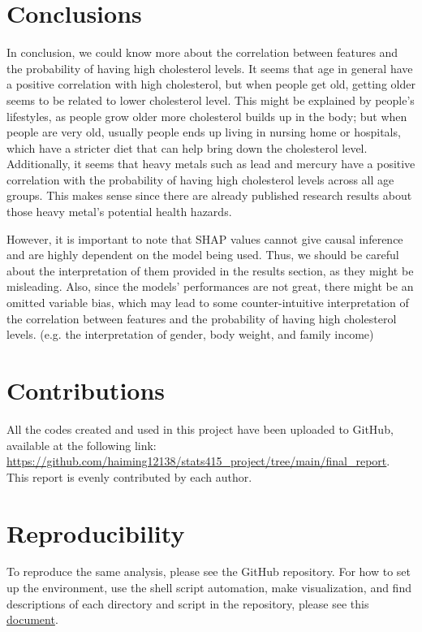 \documentclass{article}
\begin{document}
\section{Conclusions}
In conclusion, we could know more about the correlation between features and the probability of having high cholesterol levels. It seems that age in general have a positive correlation with high cholesterol, but when people get old, getting older seems to be related to lower cholesterol level. This might be explained by people's lifestyles, as people grow older more cholesterol builds up in the body; but when people are very old, usually people ends up living in nursing home or hospitals, which have a stricter diet that can help bring down the cholesterol level. Additionally, it seems that heavy metals such as lead and mercury have a positive correlation with the probability of having high cholesterol levels across all age groups. This makes sense since there are already published research results about those heavy metal's potential health hazards.

However, it is important to note that SHAP values cannot give causal inference and are highly dependent on the model being used. Thus, we should be careful about the interpretation of them provided in the results section, as they might be misleading. Also, since the models' performances are not great, there might be an omitted variable bias, which may lead to some counter-intuitive interpretation of the correlation between features and the probability of having high cholesterol levels. (e.g. the interpretation of gender, body weight, and family income)

\section{Contributions}

All the codes created and used in this project have been uploaded to GitHub, available at the following link: \url{https://github.com/haiming12138/stats415_project/tree/main/final_report}. This report is evenly contributed by each author.

\section{Reproducibility}
To reproduce the same analysis, please see the GitHub repository.
For how to set up the environment, use the shell script automation, make visualization, and find descriptions of each directory and script in the repository, please see this \href{https://github.com/haiming12138/stats415_project/blob/main/final_report/use_guide.md}{document}.
\end{document}
